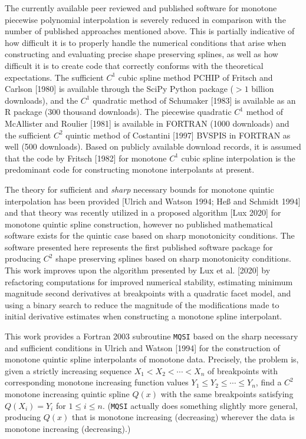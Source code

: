 The currently available peer reviewed and published software for
monotone piecewise polynomial interpolation is severely reduced in
comparison with the number of published approaches mentioned
above. This is partially indicative of how difficult it is to properly
handle the numerical conditions that arise when constructing and
evaluating precise shape preserving splines, as well as how difficult
it is to create code that correctly conforms with the theoretical
expectations. The sufficient $C^1$ cubic spline method PCHIP of
Fritsch and Carlson [1980] is available through the SciPy Python
package ($>1$ billion downloads), and the $C^1$ quadratic method of
Schumaker [1983] is available as an R package (300 thousand
downloads). The piecewise quadratic $C^1$ method of McAllister and
Roulier [1981] is available in FORTRAN (1000 downloads) and the
sufficient $C^2$ quintic method of Costantini [1997] BVSPIS in FORTRAN
as well (500 downloads). Based on publicly available download records,
it is assumed that the code by Fritsch [1982] for monotone $C^1$ cubic
spline interpolation is the predominant code for constructing monotone
interpolants at present.

The theory for sufficient and {\it sharp} necessary bounds for
monotone quintic interpolation has been provided [Ulrich and Watson
  1994; He{\ss} and Schmidt 1994] and that theory was recently
utilized in a proposed algorithm [Lux 2020] for monotone quintic
spline construction, however no published mathematical software exists
for the quintic case based on sharp monotonicity conditions. The
software presented here represents the first published software
package for producing $C^2$ shape preserving splines based on sharp
monotonicity conditions. This work improves upon the algorithm
presented by Lux et al. [2020] by refactoring computations for
improved numerical stability, estimating minimum magnitude second
derivatives at breakpoints with a quadratic facet model, and using a
binary search to reduce the magnitude of the modifications made to
initial derivative estimates when constructing a monotone spline
interpolant.


This work provides a Fortran 2003 subroutine {\tt MQSI} based on the
sharp necessary and sufficient conditions in Ulrich and Watson [1994]
for the construction of monotone quintic spline interpolants of
monotone data. Precisely, the problem is, given a strictly increasing
sequence $X_1<X_2< \cdots <X_n$ of breakpoints with corresponding
monotone increasing function values $Y_1\le Y_2\le \cdots \le Y_n$,
find a $C^2$ monotone increasing quintic spline $Q(x)$ with the same
breakpoints satisfying $Q(X_i)=Y_i$ for $1\le i\le n$. ({\tt MQSI}
actually does something slightly more general, producing $Q(x)$ that
is monotone increasing (decreasing) wherever the data is monotone
increasing (decreasing).)

